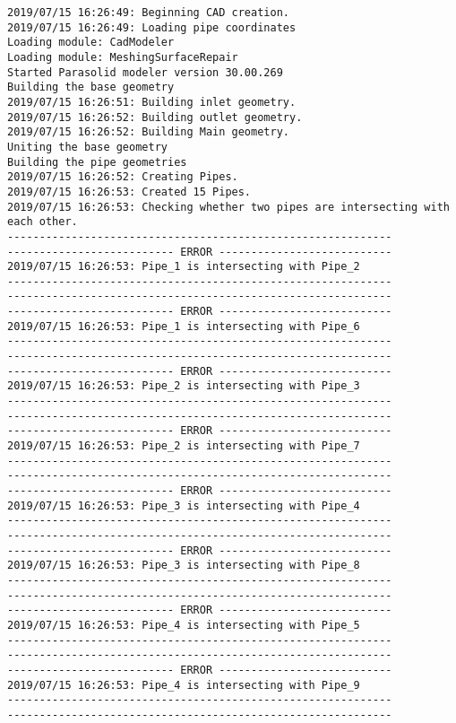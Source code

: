 \documentclass{article}
\begin{document}
{\tiny 
\begin{verbatim}
2019/07/15 16:26:49: Beginning CAD creation.
2019/07/15 16:26:49: Loading pipe coordinates
Loading module: CadModeler
Loading module: MeshingSurfaceRepair
Started Parasolid modeler version 30.00.269
Building the base geometry
2019/07/15 16:26:51: Building inlet geometry.
2019/07/15 16:26:52: Building outlet geometry.
2019/07/15 16:26:52: Building Main geometry.
Uniting the base geometry
Building the pipe geometries
2019/07/15 16:26:52: Creating Pipes.
2019/07/15 16:26:53: Created 15 Pipes.
2019/07/15 16:26:53: Checking whether two pipes are intersecting with each other.
------------------------------------------------------------
-------------------------- ERROR ---------------------------
2019/07/15 16:26:53: Pipe_1 is intersecting with Pipe_2
------------------------------------------------------------
------------------------------------------------------------
-------------------------- ERROR ---------------------------
2019/07/15 16:26:53: Pipe_1 is intersecting with Pipe_6
------------------------------------------------------------
------------------------------------------------------------
-------------------------- ERROR ---------------------------
2019/07/15 16:26:53: Pipe_2 is intersecting with Pipe_3
------------------------------------------------------------
------------------------------------------------------------
-------------------------- ERROR ---------------------------
2019/07/15 16:26:53: Pipe_2 is intersecting with Pipe_7
------------------------------------------------------------
------------------------------------------------------------
-------------------------- ERROR ---------------------------
2019/07/15 16:26:53: Pipe_3 is intersecting with Pipe_4
------------------------------------------------------------
------------------------------------------------------------
-------------------------- ERROR ---------------------------
2019/07/15 16:26:53: Pipe_3 is intersecting with Pipe_8
------------------------------------------------------------
------------------------------------------------------------
-------------------------- ERROR ---------------------------
2019/07/15 16:26:53: Pipe_4 is intersecting with Pipe_5
------------------------------------------------------------
------------------------------------------------------------
-------------------------- ERROR ---------------------------
2019/07/15 16:26:53: Pipe_4 is intersecting with Pipe_9
------------------------------------------------------------
------------------------------------------------------------

\end{verbatim}}
\end{document}
